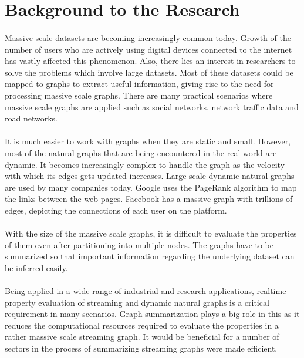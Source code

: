 \section{Background to the Research}

\paragraph{}
Massive-scale datasets are becoming increasingly common today. Growth of the number of users who are actively using digital devices connected to the internet has vastly affected this phenomenon. Also, there lies an interest in researchers to solve the problems which involve large datasets. Most of these datasets could be mapped to graphs to extract useful information, giving rise to the need for processing massive scale graphs. There are many practical scenarios where massive scale graphs are applied such as social networks, network traffic data and road networks.

\paragraph{}
It is much easier to work with graphs when they are static and small. However, most of the natural graphs that are being encountered in the real world are dynamic. It becomes increasingly complex to handle the graph as the velocity with which its edges gets updated increases. Large scale dynamic natural graphs are used by many companies today. Google uses the PageRank algorithm \cite{brin_anatomy_1998, page_pagerank_nodate} to map the links between the web pages. Facebook has a massive graph with trillions of edges\cite{ching_one_2015}, depicting the connections of each user on the platform.

\paragraph{}
With the size of the massive scale graphs, it is difficult to evaluate the properties of them even after partitioning into multiple nodes. The graphs have to be summarized so that important information regarding the underlying dataset can be inferred easily.

\paragraph{}
Being applied in a wide range of industrial and research applications, realtime property evaluation of streaming and dynamic natural graphs is a critical requirement in many scenarios. Graph summarization plays a big role in this as it reduces the computational resources required to evaluate the properties in a rather massive scale streaming graph. It would be beneficial for a number of sectors in the process of summarizing streaming graphs were made efficient.